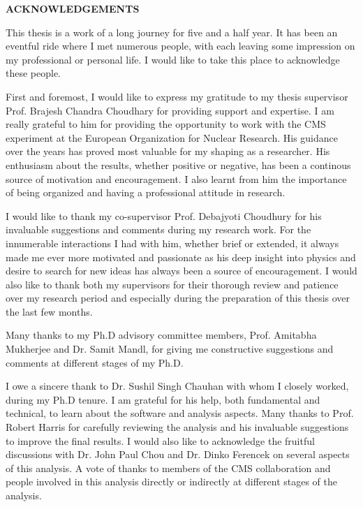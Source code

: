 \begin{center}
{\large\textbf{ACKNOWLEDGEMENTS}}
\end{center}

\onehalfspacing

This thesis is a work of a long journey for five and a half year. It has been an eventful ride where I met numerous people, with each
leaving some impression on my professional or personal life. I would like to take this place to acknowledge these people.

First and foremost, I would like to express my gratitude to my thesis supervisor Prof. Brajesh Chandra Choudhary for providing support 
and expertise. I am really grateful to him for providing the opportunity to work with the CMS experiment at the European Organization 
for Nuclear Research. His guidance over the years has proved most valuable for my shaping as a researcher. His enthusiasm about the results, 
whether positive or negative, has been a continous source of motivation and encouragement. I also learnt from him the importance of being 
organized and having a professional attitude in research.
  
I would like to thank my co-supervisor Prof. Debajyoti Choudhury for his invaluable suggestions and comments during my research work.
For the innumerable interactions I had with him, whether brief or extended, it always made me ever more motivated and passionate as his deep insight into physics
and desire to search for new ideas has always been a source of encouragement. I would also like to thank both my supervisors for their thorough review and 
patience over my research period and especially during the preparation of this thesis over the last few months.

Many thanks to my Ph.D advisory committee members, Prof. Amitabha Mukherjee and Dr. Samit Mandl, for giving me constructive suggestions and comments at different stages
of my Ph.D.

I owe a sincere thank to Dr. Sushil Singh Chauhan with whom I closely worked, during my Ph.D tenure. I am grateful for his help, both fundamental and technical,
to learn about the software and analysis aspects. Many thanks to Prof. Robert Harris for carefully reviewing the analysis and his invaluable suggestions to improve 
the final results. I would also like to acknowledge the fruitful discussions with Dr. John Paul Chou and Dr. Dinko Ferencek on several aspects of this analysis. A 
vote of thanks to members of the CMS collaboration and people involved in this analysis directly or indirectly at different stages of the analysis.

